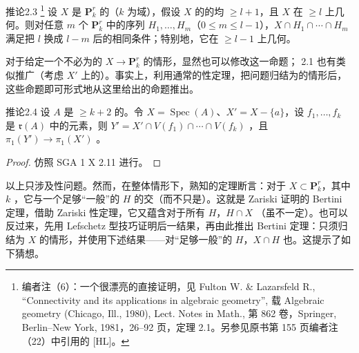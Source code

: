 \begin{SGAresult}{推论}{2.3}
\footnote{编者注（6）：一个很漂亮的直接证明，见 Fulton W. \& Lazarsfeld R., “Connectivity and its applications in algebraic geometry”, 载 Algebraic geometry (Chicago, Ill., 1980), Lect. Notes in Math., 第 862 卷，Springer, Berlin--New York, 1981，26--92 页，定理 2.1。另参见原书第 155 页编者注（22）中引用的 [HL]。}
设 $X$ 是 $\mathbf P^r_k$ 的（$k$ 为域），假设 $X$ 的的均 $\geq l+1$，且 $X$ 在 $\geq l$ 上几何。则对任意 $m$ 个 $\mathbf P^r_k$ 中的序列 $H_1,\ldots,H_m$（$0\leq m\leq l-1$），$X\cap H_1\cap\cdots\cap H_m$ 满足把 $l$ 换成 $l-m$ 后的相同条件；特别地，它在 $\geq l-1$ 上几何。
\end{SGAresult}
对于给定一个不必为的 $X\to\mathbf P^r_k$ 的情形，显然也可以修改这一命题；
2.1 也有类似推广（考虑 $X'$ 上的）。事实上，利用通常的性定理，把问题归结为的情形后，这些命题即可形式地从这里给出的命题推出。

\begin{SGAresult}{推论}{2.4}
设 $A$ 是 $\geq k+2$ 的。令 $X=\operatorname{Spec}(A)$、$X'=X-\{a\}$，设 $f_1,\ldots,f_k$ 是 $\mathfrak r(A)$ 中的元素，则 $Y'=X'\cap V(f_1)\cap\cdots\cap V(f_k)$ ，且 $\pi_1(Y')\to\pi_1(X')$ 。
\end{SGAresult}
\begin{proof}
仿照 SGA 1 X 2.11 进行。
\end{proof}
以上只涉及性问题。然而，在整体情形下，熟知的定理断言：对于 $X\subset\mathbf P^r_k$，其中 $k$ ，它与一个足够“一般”的 $H$ 的交（而不只是）。这就是 Zariski 证明的 Bertini 定理，借助 Zariski 性定理，它又蕴含对于所有 $H$，$H\cap X$ （虽不一定）。也可以反过来，先用 Lefschetz 型技巧证明后一结果，再由此推出 Bertini 定理：只须归结为 $X$ 的情形，并使用下述结果——对“足够一般”的 $H$，$X\cap H$ 也。这提示了如下猜想。

